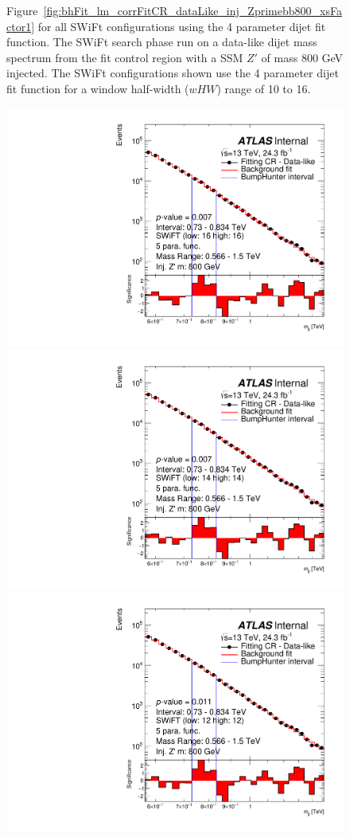 \begin{figure}[!htb]
{}
\caption[Figure~\ref{fig:bhFit_lm_corrFitCR_dataLike_inj_Zprimebb800_xsFactor1} for all SWiFt configurations using the 4 parameter dijet fit function.]
{\label{fig:app-bhFit_lm_corrFitCR_dataLike_inj_Zprimebb800_xsFactor1_4para}
Figure~\ref{fig:bhFit_lm_corrFitCR_dataLike_inj_Zprimebb800_xsFactor1} for all SWiFt configurations using the 4 parameter dijet fit function.    
  The SWiFt search phase run on a data-like dijet mass spectrum
  from the fit control region with a SSM $Z'$ of mass 800 GeV injected.
  The SWiFt configurations shown use the 4 parameter dijet fit function for a window half-width ($wHW$) range of 10 to 16.
}
\end{figure}
\begin{figure}[!htb]
\captionsetup[subfigure]{aboveskip=0pt,justification=centering}
 {
  \includegraphics[width=0.48\linewidth, angle=0]{figs/Dibjet/LowMass/FitStudy_min566/bhFit_corrFitCR_dataLike_5para_low16_high16_inj_Zprimebb800_xsFactor1.pdf}
}
 {
  \includegraphics[width=0.48\linewidth, angle=0]{figs/Dibjet/LowMass/FitStudy_min566/bhFit_corrFitCR_dataLike_5para_low14_high14_inj_Zprimebb800_xsFactor1.pdf}
}
 {
  \includegraphics[width=0.48\linewidth, angle=0]{figs/Dibjet/LowMass/FitStudy_min566/bhFit_corrFitCR_dataLike_5para_low12_high12_inj_Zprimebb800_xsFactor1.pdf}
}
\end{figure}
